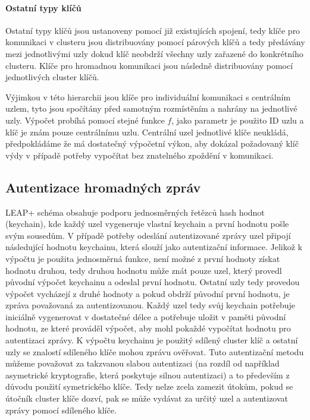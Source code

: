 \documentclass[11pt,final,twoside]{fithesis2}
\begin{document}
\paragraph{Ostatní typy klíčů} 
Ostatní typy klíčů jsou ustanoveny pomocí již existujících spojení, tedy klíče pro komunikaci v clusteru jsou distribuovány pomocí párových klíčů a tedy předávány mezi jednotlivými uzly dokud 
klíč neobdrží všechny uzly zařazené do konkrétního clusteru. Klíče pro hromadnou komunikaci jsou následně distribuovány pomocí jednotlivých cluster klíčů. 

Výjimkou v této hierarchii jsou klíče pro individuální komunikaci s centrálním uzlem, tyto jsou spočítány před samotným rozmístěním a nahrány na jednotlivé uzly. Výpočet probíhá pomocí stejné funkce $f$, 
jako parametr je použito ID uzlu a klíč je znám pouze centrálnímu uzlu. Centrální uzel jednotlivé klíče neukládá, předpokládáme že má dostatečný výpočetní výkon, aby dokázal požadovaný klíč výdy v případě 
potřeby vypočítat bez znatelného zpoždění v komunikaci.

\subsection{Autentizace hromadných zpráv}
LEAP+ schéma obsahuje podporu jednosměrných řetězců hash hodnot \cite{Lamport1981} (keychain), kde každý uzel vygeneruje vlastní keychain a první hodnotu pošle svým sousedům. 
V případě potřeby odeslání autentizované zprávy uzel připojí následující hodnotu keychainu, která slouží jako autentizační informace. Jelikož k výpočtu je použita jednosměrná funkce, není možné z první 
hodnoty získat hodnotu druhou, tedy druhou hodnotu může znát pouze uzel, který provedl původní výpočet keychainu a odeslal první hodnotu. Ostatní uzly tedy provedou výpočet vycházejí z druhé hodnoty a pokud 
obdrží původní první hodnotu, je zpráva považovaná za autentizovanou. Každý uzel tedy svůj keychain potřebuje iniciálně vygenerovat v dostatečné délce a potřebuje uložit v paměti původní hodnotu, ze které 
prováděl výpočet, aby mohl pokaždé vypočítat hodnotu pro autentizaci zprávy. K výpočtu keychainu je použitý sdílený cluster klíč a ostatní uzly se znalostí sdíleného klíče mohou zprávu ověřovat.
Tuto autentizační metodu můžeme považovat za takzvanou slabou autentizaci (na rozdíl od například asymetrické kryptografie, která poskytuje silnou autentizaci) a to především z důvodu použití symetrického 
klíče. Tedy nelze zcela zamezit útokům, pokud se útočník cluster klíče dozví, pak se může vydávat za určitý uzel a autentizovat zprávy pomocí sdíleného klíče.
\end{document}
